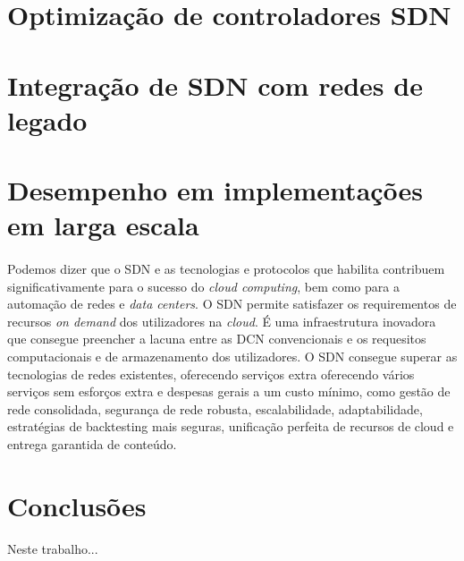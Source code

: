 \documentclass{llncs}
\begin{document}
\section{Optimização de controladores SDN}

\section{Integração de SDN com redes de legado}

\section{Desempenho em implementações em larga escala}
\paragraph{}
Podemos dizer que o SDN e as tecnologias e protocolos que habilita contribuem significativamente para o sucesso do \textit {cloud computing}, bem como para a automação de redes e \textit {data centers}. O SDN permite satisfazer os requirementos de recursos \textit{on demand} dos utilizadores na \textit{cloud}. É uma infraestrutura inovadora que consegue preencher a lacuna entre as DCN convencionais e os requesitos computacionais e de armazenamento dos utilizadores.
O SDN consegue superar as tecnologias de redes existentes, oferecendo serviços extra oferecendo vários serviços sem esforços extra e despesas gerais a um custo mínimo, como gestão de rede consolidada, segurança de rede robusta, escalabilidade, adaptabilidade, estratégias de backtesting mais seguras, unificação perfeita de recursos de cloud e entrega garantida de conteúdo.








\section{Conclusões}
Neste trabalho...

\printbibliography
\end{document}
